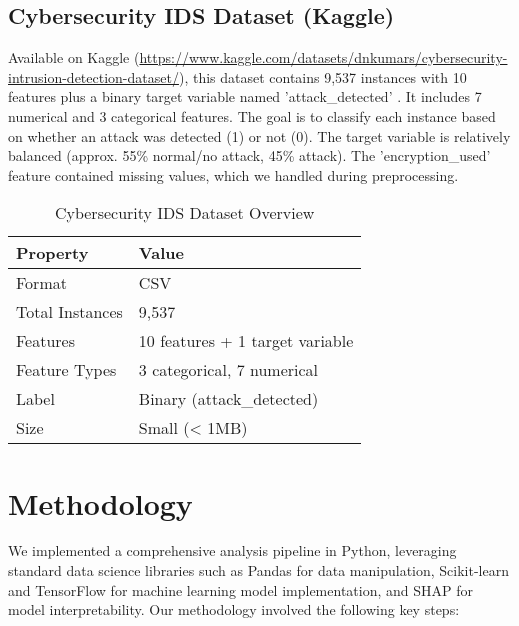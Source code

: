 \documentclass[sigconf,screen,final,nonacm]{acmart}
\begin{document}
\subsection{Cybersecurity IDS Dataset (Kaggle)}
Available on Kaggle (\url{https://www.kaggle.com/datasets/dnkumars/cybersecurity-intrusion-detection-dataset/}), this dataset contains 9,537 instances with 10 features plus a binary target variable named 'attack\_detected' \cite{kumar2023cybersecurity}. It includes 7 numerical and 3 categorical features. The goal is to classify each instance based on whether an attack was detected (1) or not (0). The target variable is relatively balanced (approx. 55\% normal/no attack, 45\% attack). The 'encryption\_used' feature contained missing values, which we handled during preprocessing.
\begin{table}[h]
\caption{Cybersecurity IDS Dataset Overview}
\centering
\begin{tabular}{p{2.5cm}p{5cm}}
\toprule
\textbf{Property} & \textbf{Value} \\
\midrule
Format & CSV \\
Total Instances & 9,537 \\
Features & 10 features + 1 target variable \\
Feature Types & 3 categorical, 7 numerical \\
Label & Binary (attack\_detected) \\
Size & Small (< 1MB) \\
\bottomrule
\end{tabular}
\end{table}

\section{Methodology}
We implemented a comprehensive analysis pipeline in Python, leveraging standard data science libraries such as Pandas for data manipulation, Scikit-learn and TensorFlow for machine learning model implementation, and SHAP for model interpretability. Our methodology involved the following key steps:
\end{document}
